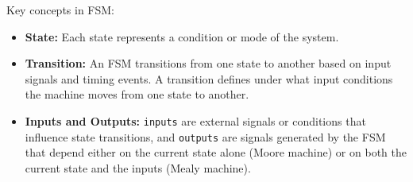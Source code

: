 \documentclass{article}
\begin{document}
Key concepts in FSM:
\begin{itemize}
    \item \textbf{State:} Each state represents a condition or mode of the system.
    \item \textbf{Transition:} An FSM transitions from one state to another based on input signals and timing events. A transition defines under what input conditions the machine moves from one state to another.
    \item \textbf{Inputs and Outputs:} \texttt{inputs} are external signals or conditions that influence state transitions, and \texttt{outputs} are signals generated by the FSM that depend either on the current state alone (Moore machine) or on both the current state and the inputs (Mealy machine).
\end{itemize}
\end{document}
